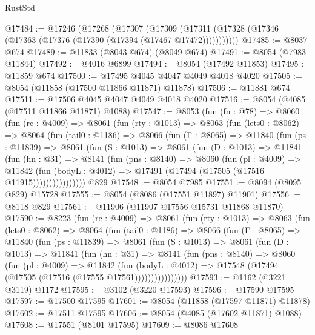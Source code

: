 \begin{lexlean}{RustStd}
\begin{coremodule}
@17484 := @17246
    (@17268
      (@17307
        (@17309 (@17311 (@17328 (@17346 (@17363 (@17376 (@17390 (@17394 (@17467 @17472)))))))))))
@17485 := @8037 @674
@17489 := @11833 (@8043 @674) (@8049 @674)
@17491 := @8054 (@7983 @11844)
@17492 := @4016 @6899
@17494 := @8054 (@17492 @11853)
@17495 := @11859 @674
@17500 := @17495 @4045 @4047 @4049 @4018 @4020
@17505 := @8054 (@11858 (@17500 @11866 @11871) @11878)
@17506 := @11881 @674
@17511 := @17506 @4045 @4047 @4049 @4018 @4020
@17516 := @8054 (@4085 (@17511 @11866 @11871) @1088)
@17547 := @8053
    (fun (fn : @78) =>
    @8060
      (fun (rc : @4009) =>
      @8061
        (fun (rty : @1013) =>
        @8063
          (fun (lets0 : @8062) =>
          @8064
            (fun (tail0 : @1186) =>
            @8066
              (fun (Γ : @8065) =>
              @11840
                (fun (ps : @11839) =>
                @8061
                  (fun (S : @1013) =>
                  @8061
                    (fun (D : @1013) =>
                    @11841
                      (fun (hn : @31) =>
                      @8141
                        (fun (pns : @8140) =>
                        @8060
                          (fun (pl : @4009) =>
                          @11842
                            (fun (bodyL : @4012) =>
                            @17491 (@17494 (@17505 (@17516 @11915))))))))))))))))
    @829
@17548 := @8054 @7985
@17551 := @8094 (@8095 @829) @15728
@17555 := @8054 (@8086 (@17551 @11897) @11901)
@17556 := @8118 @829
@17561 := @11906 (@11907 @17556 @15731 @11868 @11870)
@17590 := @8223
    (fun (rc : @4009) =>
    @8061
      (fun (rty : @1013) =>
      @8063
        (fun (lets0 : @8062) =>
        @8064
          (fun (tail0 : @1186) =>
          @8066
            (fun (Γ : @8065) =>
            @11840
              (fun (ps : @11839) =>
              @8061
                (fun (S : @1013) =>
                @8061
                  (fun (D : @1013) =>
                  @11841
                    (fun (hn : @31) =>
                    @8141
                      (fun (pns : @8140) =>
                      @8060
                        (fun (pl : @4009) =>
                        @11842
                          (fun (bodyL : @4012) =>
                          @17548 (@17494 (@17505 (@17516 (@17555 @17561))))))))))))))))
@17593 := @1162 (@3221 @3119) @1172
@17595 := @3102 (@3220 @17593)
@17596 := @17590 @17595
@17597 := @17500 @17595
@17601 := @8054 (@11858 (@17597 @11871) @11878)
@17602 := @17511 @17595
@17606 := @8054 (@4085 (@17602 @11871) @1088)
@17608 := @17551 (@8101 @17595)
@17609 := @8086 @17608

\end{coremodule}
\end{lexlean}
